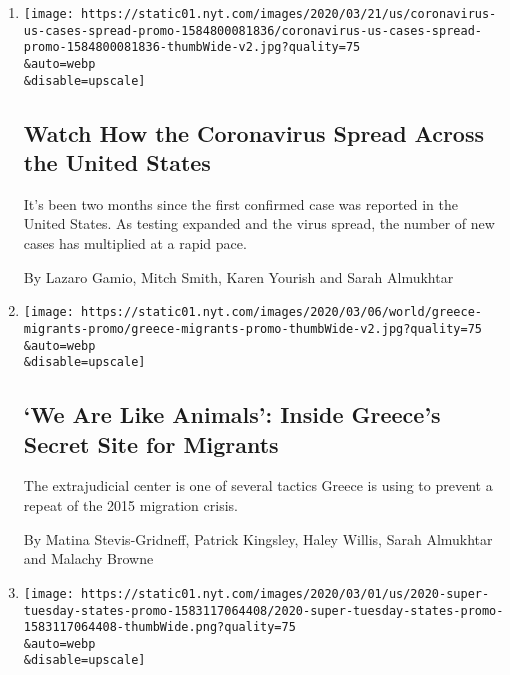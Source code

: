 \begin{enumerate}
\def\labelenumi{\arabic{enumi}.}
\item
  \href{/interactive/2020/03/21/us/coronavirus-us-cases-spread.html}{}

  \texttt{[image: https://static01.nyt.com/images/2020/03/21/us/coronavirus-us-cases-spread-promo-1584800081836/coronavirus-us-cases-spread-promo-1584800081836-thumbWide-v2.jpg?quality=75\\\&auto=webp\\\&disable=upscale]}

  \hypertarget{watch-how-the-coronavirus-spread-across-the-united-states}{%
  \subsection{Watch How the Coronavirus Spread Across the United
  States}\label{watch-how-the-coronavirus-spread-across-the-united-states}}

  It's been two months since the first confirmed case was reported in
  the United States. As testing expanded and the virus spread, the
  number of new cases has multiplied at a rapid pace.

  By Lazaro Gamio, Mitch Smith, Karen Yourish and Sarah Almukhtar
\item
  \href{/2020/03/10/world/europe/greece-migrants-secret-site.html}{}

  \texttt{[image: https://static01.nyt.com/images/2020/03/06/world/greece-migrants-promo/greece-migrants-promo-thumbWide-v2.jpg?quality=75\\\&auto=webp\\\&disable=upscale]}

  \hypertarget{we-are-like-animals-inside-greeces-secret-site-for-migrants}{%
  \subsection{`We Are Like Animals': Inside Greece's Secret Site for
  Migrants}\label{we-are-like-animals-inside-greeces-secret-site-for-migrants}}

  The extrajudicial center is one of several tactics Greece is using to
  prevent a repeat of the 2015 migration crisis.

  By Matina Stevis-Gridneff, Patrick Kingsley, Haley Willis, Sarah
  Almukhtar and Malachy Browne
\item
  \href{/interactive/2020/03/02/us/politics/2020-super-tuesday-states.html}{}

  \texttt{[image: https://static01.nyt.com/images/2020/03/01/us/2020-super-tuesday-states-promo-1583117064408/2020-super-tuesday-states-promo-1583117064408-thumbWide.png?quality=75\\\&auto=webp\\\&disable=upscale]}


\end{enumerate}
